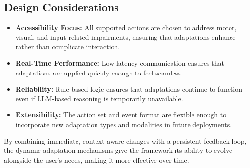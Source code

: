 \documentclass[openany]{book}
\begin{document}
\subsection{Design Considerations}
\begin{itemize}
    \item \textbf{Accessibility Focus:} All supported actions are chosen to address motor, visual, and input-related impairments, ensuring that adaptations enhance rather than complicate interaction.
    \item \textbf{Real-Time Performance:} Low-latency communication ensures that adaptations are applied quickly enough to feel seamless.
    \item \textbf{Reliability:} Rule-based logic ensures that adaptations continue to function even if LLM-based reasoning is temporarily unavailable.
    \item \textbf{Extensibility:} The action set and event format are flexible enough to incorporate new adaptation types and modalities in future deployments.
\end{itemize}
By combining immediate, context-aware changes with a persistent feedback loop, the dynamic adaptation mechanisms give the framework its ability to evolve alongside the user’s needs, making it more effective over time.



\end{document}
